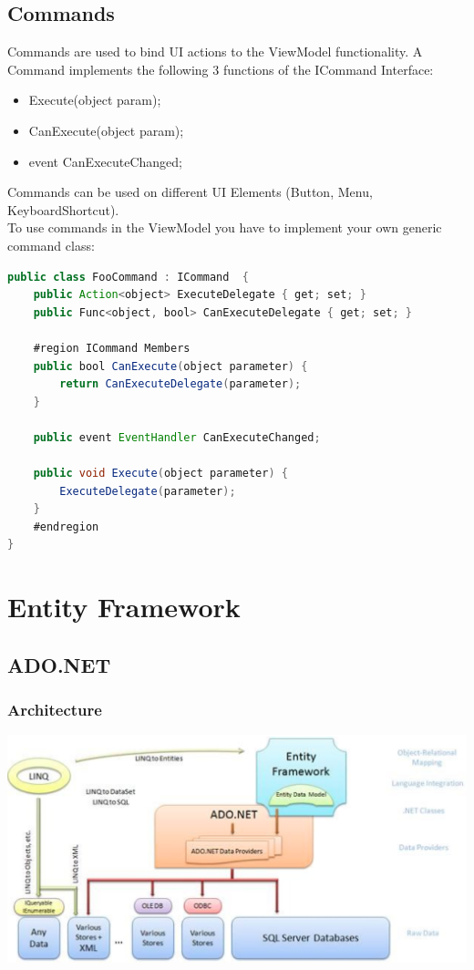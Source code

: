 \documentclass[10pt]{article}
\begin{document}
\subsection{Commands}
Commands are used to bind UI actions to the ViewModel functionality. A Command implements the following 3 functions of the ICommand Interface:
\begin{itemize}
	\item Execute(object param);
	\item CanExecute(object param);
	\item event CanExecuteChanged;
\end{itemize}
Commands can be used on different UI Elements (Button, Menu, KeyboardShortcut). \\
To use commands in the ViewModel you have to implement your own generic command class:
\begin{lstlisting}[language=Java, caption=Commands:, style=JavaStyle]
public class FooCommand : ICommand  {
	public Action<object> ExecuteDelegate { get; set; }
	public Func<object, bool> CanExecuteDelegate { get; set; }
	
	#region ICommand Members
	public bool CanExecute(object parameter) {
		return CanExecuteDelegate(parameter);
	}

	public event EventHandler CanExecuteChanged;
	
	public void Execute(object parameter) {
		ExecuteDelegate(parameter);
	}
	#endregion
}
\end{lstlisting}

\pagebreak
\section{Entity Framework}
\subsection{ADO.NET}
\subsubsection{Architecture}
\begin{center}
	\includegraphics[scale=0.25]{ado_architecture.png}
\end{center}
\end{document}
